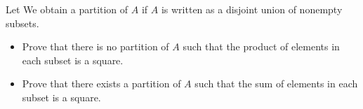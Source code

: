 Let  We obtain a partition of $A$ if $A$ is written as a disjoint union of nonempty subsets.
\begin{itemize}
	\item Prove that there is no partition of $A$ such that the product of elements in each subset is a square.
	\item Prove that there exists a partition of $A$ such that the sum of elements in each subset is a square.
\end{itemize}

